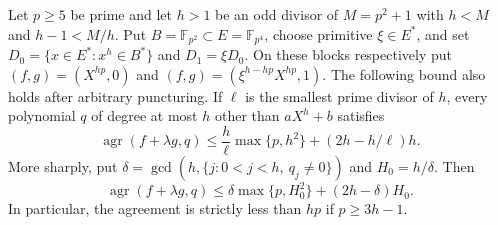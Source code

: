 \begin{lemma}
\label{lem:odd-power-exact-source}
Let $p\ge5$ be prime and let $h>1$ be an odd divisor of $M=p^2+1$
with $h<M$ and $h-1<M/h$. Put $B=\mathbb F_{p^2}\subset E=\mathbb F_{p^4}$,
choose primitive $\xi\in E^*$, and set
$D_0=\{x\in E^*:x^h\in B^*\}$ and $D_1=\xi D_0$.
On these blocks respectively put $(f,g)=(X^{hp},0)$ and
$(f,g)=(\xi^{h-hp}X^{hp},1)$. The following bound also holds after
arbitrary puncturing. If $\ell$ is the smallest prime divisor of $h$,
every polynomial $q$
of degree at most $h$ other than $aX^h+b$ satisfies
\[
 \operatorname{agr}(f+\lambda g,q)
 \le \frac h\ell\max\{p,h^2\}+(2h-h/\ell)h.
\]
More sharply, put $\delta=\gcd(h,\{j:0<j<h,\ q_j\ne0\})$ and $H_0=h/\delta$. Then
\[
 \operatorname{agr}(f+\lambda g,q)
 \le\delta\max\{p,H_0^2\}+(2h-\delta)H_0.
\]
In particular, the agreement is strictly less than $hp$ if $p\ge3h-1$.
\end{lemma}
